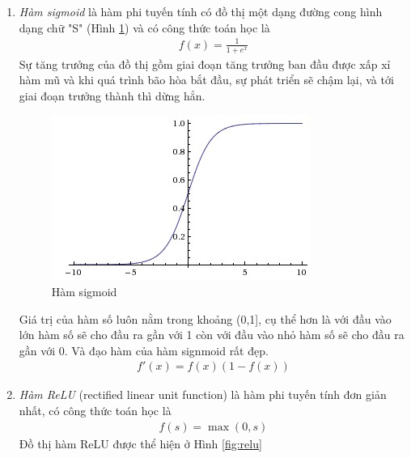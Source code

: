 \begin{enumerate}
\item  \textit{Hàm sigmoid} là hàm phi tuyến tính có đồ thị một dạng đường cong hình dạng chữ "S" (Hình \ref{fig:sigmoid}) và có công thức toán học là 
\begin{align}
f(x) = \frac{1}{1+e^{x}}
\end{align}
Sự tăng trưởng của đồ thị gồm giai đoạn tăng trưởng ban đầu được xấp xỉ hàm mũ và khi quá trình bão hòa bắt đầu, sự phát triển sẽ chậm lại, và tới giai đoạn trưởng thành thì dừng hẳn.
\begin{center}
 	\begin{figure}[H]
    \begin{center}
    \includegraphics[scale=0.6]{chap3/image/sigmoid.jpeg}
    \end{center}
    \caption{Hàm sigmoid}
    \label{fig:sigmoid}
    \end{figure}
\end{center}
Giá trị của hàm số luôn nằm trong khoảng (0,1], cụ thể hơn là với đầu vào lớn hàm số sẽ cho đầu ra gần với 1 còn với đầu vào nhỏ hàm số sẽ cho đầu ra gần với 0. Và đạo hàm của hàm signmoid rất đẹp.
\begin{align}
f'(x) = f(x)(1-f(x))
\end{align}
\item
\label{sec:relu}
\textit{Hàm ReLU} (rectified linear unit function) là hàm phi tuyến tính đơn giản nhất, có công thức toán học là
\begin{align}
f(s)=\max(0,s)
\end{align} 
Đồ thị hàm ReLU được thể hiện ở Hình \ref{fig:relu}
\begin{center}

\end{center}
\end{enumerate}

